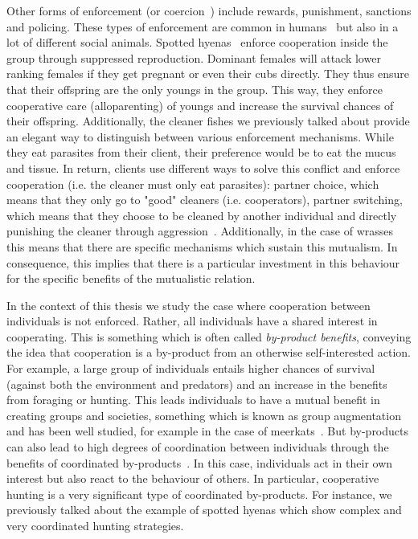     Other forms of enforcement (or coercion~\parencite{Clutton-Brock2002}) include rewards, punishment, sanctions and policing. These types of enforcement are common in humans~\parencite{Fehr2002} but also in a lot of different social animals. Spotted hyenas~\parencite{Drea2003, Drea2009a, Smith2012a} enforce cooperation inside the group through suppressed reproduction. Dominant females will attack lower ranking females if they get pregnant or even their cubs directly. They thus ensure that their offspring are the only youngs in the group. This way, they enforce cooperative care (alloparenting) of youngs and increase the survival chances of their offspring. Additionally, the cleaner fishes we previously talked about provide an elegant way to distinguish between various enforcement mechanisms. While they eat parasites from their client, their preference would be to eat the mucus and tissue. In return, clients use different ways to solve this conflict and enforce cooperation (i.e. the cleaner must only eat parasites): partner choice, which means that they only go to "good" cleaners (i.e. cooperators), partner switching, which means that they choose to be cleaned by another individual and directly punishing the cleaner through aggression~\parencite{Bshary2005}. Additionally, in the case of wrasses this means that there are specific mechanisms which sustain this mutualism. In consequence, this implies that there is a particular investment in this behaviour for the specific benefits of the mutualistic relation.


    In the context of this thesis we study the case where cooperation between individuals is not enforced. Rather, all individuals have a shared interest in cooperating. This is something which is often called \emph{by-product benefits}, conveying the idea that cooperation is a by-product from an otherwise self-interested action. For example, a large group of individuals entails higher chances of survival (against both the environment and predators) and an increase in the benefits from foraging or hunting. This leads individuals to have a mutual benefit in creating groups and societies, something which is known as group augmentation~\parencite{Bergmuller2007a} and has been well studied, for example in the case of meerkats~\parencite{Clutton-Brock2002}. But by-products can also lead to high degrees of coordination between individuals through the benefits of coordinated by-products~\parencite{Leimar2003}. In this case, individuals act in their own interest but also react to the behaviour of others. In particular, cooperative hunting is a very significant type of coordinated by-products. For instance, we previously talked about the example of spotted hyenas which show complex and very coordinated hunting strategies.

